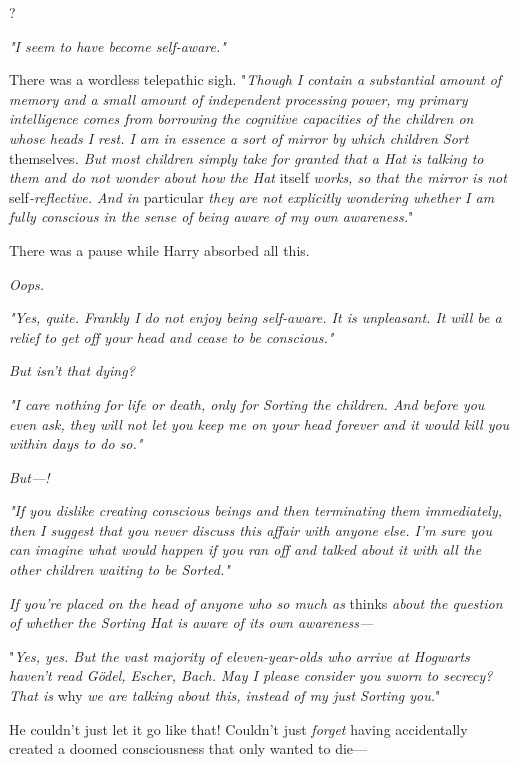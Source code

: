 
?

\emph{"I seem to have become self-aware."}

\emph{}

There was a wordless telepathic sigh. "\emph{Though I contain a substantial
amount of memory and a small amount of independent processing power, my primary
intelligence comes from borrowing the cognitive capacities of the children on
whose heads I rest. I am in essence a sort of mirror by which children Sort}
themselves\emph{. But most children simply take for granted that a Hat is
talking to them and do not wonder about how the Hat} itself \emph{works, so
that the mirror is not} self\emph{-reflective. And in} particular \emph{they
are not explicitly wondering whether I am fully conscious in the sense of being
aware of my own awareness.}"

There was a pause while Harry absorbed all this.

\emph{Oops.}

\emph{"Yes, quite. Frankly I do not enjoy being self-aware. It is unpleasant.
It will be a relief to get off your head and cease to be conscious."}

\emph{But{\el} isn't that dying?}

\emph{"I care nothing for life or death, only for Sorting the children. And
before you even ask, they will not let you keep me on your head forever and it
would kill you within days to do so."}

\emph{But---!}

\emph{"If you dislike creating conscious beings and then terminating them
immediately, then I suggest that you never discuss this affair with anyone
else. I'm sure you can imagine what would happen if you ran off and talked
about it with all the other children waiting to be Sorted."}

\emph{If you're placed on the head of anyone who so much as} thinks \emph{about
the question of whether the Sorting Hat is aware of its own awareness---}

"\emph{Yes, yes. But the vast majority of eleven-year-olds who arrive at
Hogwarts haven't read \emph{Gödel, Escher, Bach}. May I please consider you sworn to
secrecy? That is} why \emph{we are talking about this, instead of my just
Sorting you.}"

He couldn't just let it go like that! Couldn't just \emph{forget} having
accidentally created a doomed consciousness that only wanted to die---

